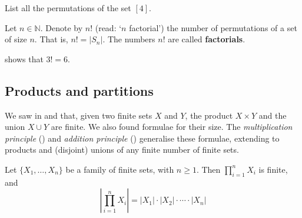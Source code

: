\begin{exercise}
List all the permutations of the set $[4]$.
\end{exercise}

\begin{definition}
\label{defFactorial}
Let $n \in \mathbb{N}$. Denote by $n!$ (read: `$n$ factorial') the number of permutations of a set of size $n$. That is, $n! = |S_n|$. The numbers $n!$ are called \textbf{factorials}.
\end{definition}

\begin{example}
 shows that $3!=6$.
\end{example}

\subsection*{Products and partitions}

We saw in  and  that, given two finite sets $X$ and $Y$, the product $X \times Y$ and the union $X \cup Y$ are finite. We also found formulae for their size. The \textit{multiplication principle} () and \textit{addition principle} () generalise these formulae, extending to products and (disjoint) unions of any finite number of finite sets.

\begin{lemma}
\label{lemMultiplicationPrincipleIndependent}
Let $\{ X_1, \dots, X_n \}$ be a family of finite sets, with $n \ge 1$. Then $\prod_{i=1}^n X_i$ is finite, and
\[ \left| \prod_{i=1}^n X_i \right| = |X_1| \cdot |X_2| \cdot \cdots \cdot |X_n| \]
\end{lemma}

